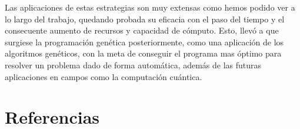 \documentclass[12pt]{article} \usepackage[utf8x]{inputenc}
\begin{document}
Las aplicaciones de estas estrategias son muy extensas como hemos podido ver a lo largo
del trabajo, quedando probada su eficacia con el paso del tiempo y el consecuente aumento
de recursos y capacidad de cómputo. Esto, llevó a que surgiese la programación genética
posteriormente, como una aplicación de los algoritmos genéticos, con la meta de conseguir el
programa mas óptimo para resolver un problema dado de forma automática, además de las futuras
aplicaciones en campos como la computación cuántica.

\section{Referencias}
\end{document}
